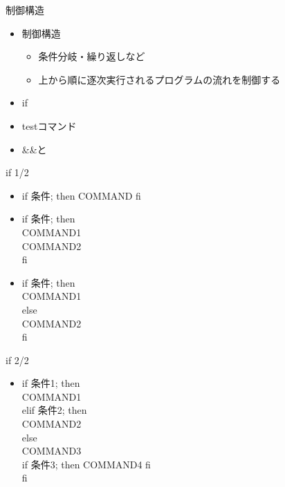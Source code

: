 \documentclass[12pt,aspectratio=169]{beamer}
\begin{document}
\begin{frame}{制御構造}

  \begin{itemize}
    \item 制御構造
      \begin{itemize}
        \item 条件分岐・繰り返しなど
        \item 上から順に逐次実行されるプログラムの流れを制御する
      \end{itemize}
    \item if
    \item testコマンド
    \item \&\&と\textbar\textbar
  \end{itemize}

\end{frame}

\begin{frame}{if 1/2}

  \begin{itemize}
    \item if 条件; then COMMAND fi
    \vspace{0.5cm}
    \item if 条件; then \\ \hspace{0.5cm}COMMAND1 \\ \hspace{0.5cm}COMMAND2 \\ fi
    \vspace{0.5cm}
    \item
      if 条件; then \\
        \hspace{0.5cm}COMMAND1 \\
      else \\
        \hspace{0.5cm}COMMAND2 \\
      fi
  \end{itemize}

\end{frame}

\begin{frame}{if 2/2}

  \begin{itemize}
    \item if 条件1; then \\
      \hspace{0.5cm}COMMAND1 \\
    elif 条件2; then \\
      \hspace{0.5cm}COMMAND2 \\
    else \\
      \hspace{0.5cm}COMMAND3 \\
      \hspace{0.5cm}if 条件3; then COMMAND4 fi \\
    fi
  \end{itemize}

\end{frame}
\end{document}
